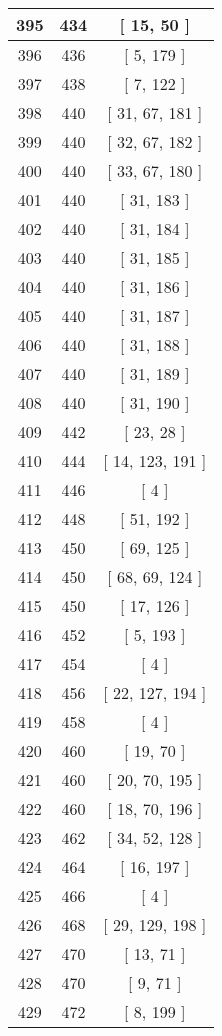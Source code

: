 \begin{center}
\begin{longtable}[H]{|| c c c ||}
\hline
395 & 434 & [ 15, 50 ] \\ 
\hline
396 & 436 & [ 5, 179 ] \\ 
\hline
397 & 438 & [ 7, 122 ] \\ 
\hline
398 & 440 & [ 31, 67, 181 ] \\ 
\hline
399 & 440 & [ 32, 67, 182 ] \\ 
\hline
400 & 440 & [ 33, 67, 180 ] \\ 
\hline
401 & 440 & [ 31, 183 ] \\ 
\hline
402 & 440 & [ 31, 184 ] \\ 
\hline
403 & 440 & [ 31, 185 ] \\ 
\hline
404 & 440 & [ 31, 186 ] \\ 
\hline
405 & 440 & [ 31, 187 ] \\ 
\hline
406 & 440 & [ 31, 188 ] \\ 
\hline
407 & 440 & [ 31, 189 ] \\ 
\hline
408 & 440 & [ 31, 190 ] \\ 
\hline
409 & 442 & [ 23, 28 ] \\ 
\hline
410 & 444 & [ 14, 123, 191 ] \\ 
\hline
411 & 446 & [ 4 ] \\ 
\hline
412 & 448 & [ 51, 192 ] \\ 
\hline
413 & 450 & [ 69, 125 ] \\ 
\hline
414 & 450 & [ 68, 69, 124 ] \\ 
\hline
415 & 450 & [ 17, 126 ] \\ 
\hline
416 & 452 & [ 5, 193 ] \\ 
\hline
417 & 454 & [ 4 ] \\ 
\hline
418 & 456 & [ 22, 127, 194 ] \\ 
\hline
419 & 458 & [ 4 ] \\ 
\hline
420 & 460 & [ 19, 70 ] \\ 
\hline
421 & 460 & [ 20, 70, 195 ] \\ 
\hline
422 & 460 & [ 18, 70, 196 ] \\ 
\hline
423 & 462 & [ 34, 52, 128 ] \\ 
\hline
424 & 464 & [ 16, 197 ] \\ 
\hline
425 & 466 & [ 4 ] \\ 
\hline
426 & 468 & [ 29, 129, 198 ] \\ 
\hline
427 & 470 & [ 13, 71 ] \\ 
\hline
428 & 470 & [ 9, 71 ] \\ 
\hline
429 & 472 & [ 8, 199 ] \\ 

\end{longtable}
\end{center}
